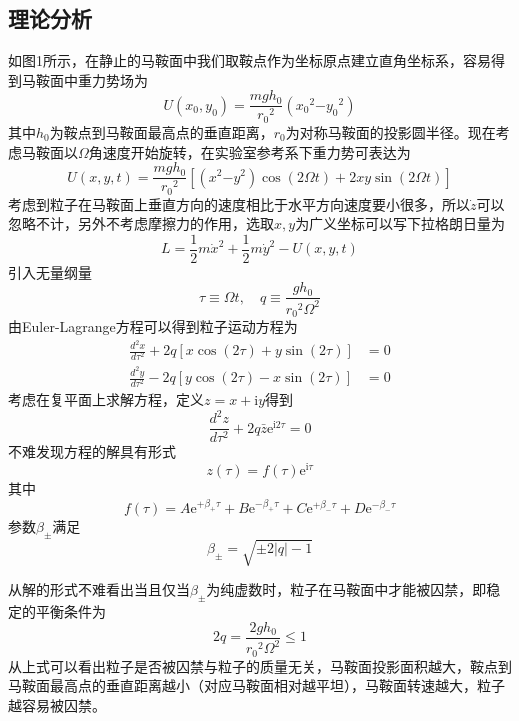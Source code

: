\documentclass{WHUReport}
\begin{document}
\begin{multicols}{2}
	\subsection{理论分析}
	如图1所示，在静止的马鞍面中我们取鞍点作为坐标原点建立直角坐标系，容易得到马鞍面中重力势场为
	\begin{equation}
		U(x_0,y_0)=\frac{mgh_0}{{r_0}^2}({x_0}^2{-y_0}^2)
	\end{equation}
	其中$h_0$为鞍点到马鞍面最高点的垂直距离，$r_0$为对称马鞍面的投影圆半径。现在考虑马鞍面以$\Omega$角速度开始旋转，在实验室参考系下重力势可表达为
	\begin{equation}
		U(x,y,t)=\frac{mgh_0}{{r_0}^2}\left[({x}^2{-y}^2)\cos(2\Omega t)+2xy\sin(2\Omega t)\right]
	\end{equation}
	考虑到粒子在马鞍面上垂直方向的速度相比于水平方向速度要小很多，所以$\dot{z}$可以忽略不计，另外不考虑摩擦力的作用，选取$x,y$为广义坐标可以写下拉格朗日量为
	\begin{equation}
		L=\frac{1}{2}m{\dot{x}}^2+\frac{1}{2}m{\dot{y}}^2-U(x,y,t)
	\end{equation}
	引入无量纲量
	\begin{equation}
		\tau\equiv \Omega t,\quad q\equiv\frac{gh_0}{{r_0}^2\Omega^2}
	\end{equation}
	由Euler-Lagrange方程可以得到粒子运动方程为
	\begin{align}
		\frac{d^2 x}{d \tau^2}+2q\left[x\cos(2 \tau)+y\sin(2\tau)\right]&=0\\
		\frac{d^2 y}{d\tau^2}-2q\left[y\cos(2 \tau)-x\sin(2\tau)\right]&=0
	\end{align}
	考虑在复平面上求解方程，定义$z=x+\mathrm{i}y$得到
	\begin{equation}
		\frac{d^2 z}{d\tau^2}+2q\bar {z}\mathrm{e}^{\mathrm{i}2\tau}=0
	\end{equation}
	不难发现方程的解具有形式
	\begin{equation}
		z(\tau)=f(\tau)\mathrm{e}^{\mathrm{i}\tau}
	\end{equation}
	其中
	\begin{equation}
		f(\tau)=A\mathrm{e}^{+\beta_+\tau}+B\mathrm{e}^{-\beta_+\tau}+C\mathrm{e}^{+\beta_-\tau}+D\mathrm{e}^{-\beta_-\tau}
	\end{equation}
	参数$\beta_\pm$满足
	\begin{equation}
		\beta_\pm=\sqrt{\pm 2|q|-1}
	\end{equation}
	
	从解的形式不难看出当且仅当$\beta_\pm$为纯虚数时，粒子在马鞍面中才能被囚禁，即稳定的平衡条件为
	\begin{equation}
		2q=\frac{2gh_0}{{r_0}^2\Omega^2}\le 1
	\end{equation}
	从上式可以看出粒子是否被囚禁与粒子的质量无关，马鞍面投影面积越大，鞍点到马鞍面最高点的垂直距离越小（对应马鞍面相对越平坦），马鞍面转速越大，粒子越容易被囚禁。

\end{multicols}
\end{document}
